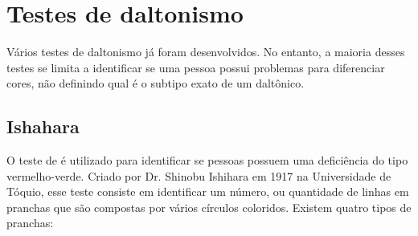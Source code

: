 \documentclass[	12pt, Times, openright, twoside, a4paper, english, brazil]{abntex2}
\begin{document}
\section{Testes de daltonismo}
Vários testes de daltonismo já foram desenvolvidos. No entanto, a maioria desses testes se limita a identificar se uma pessoa possui problemas para diferenciar cores, não definindo qual é o subtipo exato de um daltônico.

\subsection{Ishahara}
\label{subsection:Ishihara}
 O teste de  é utilizado para identificar se pessoas possuem uma deficiência do tipo vermelho-verde. Criado por Dr. Shinobu Ishihara em 1917 na Universidade de Tóquio, esse teste consiste em identificar um número, ou quantidade de linhas em pranchas que são compostas por vários círculos coloridos.
Existem quatro tipos de pranchas:
\end{document}
